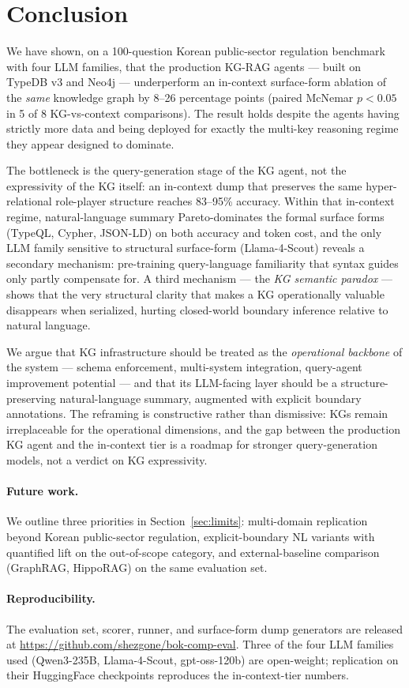 \section{Conclusion}\label{sec:conclusion}

We have shown, on a 100-question Korean public-sector regulation
benchmark with four LLM families, that the production KG-RAG
agents — built on TypeDB v3 and Neo4j — underperform an in-context
surface-form ablation of the \emph{same} knowledge graph by
8--26 percentage points (paired McNemar $p<0.05$ in 5 of 8
KG-vs-context comparisons). The result holds despite the agents
having strictly more data and being deployed for exactly the
multi-key reasoning regime they appear designed to dominate.

The bottleneck is the query-generation stage of the KG agent, not
the expressivity of the KG itself: an in-context dump that
preserves the same hyper-relational role-player structure reaches
83--95\% accuracy. Within that in-context regime, natural-language
summary Pareto-dominates the formal surface forms (TypeQL, Cypher,
JSON-LD) on both accuracy and token cost, and the only LLM family
sensitive to structural surface-form (Llama-4-Scout) reveals a
secondary mechanism: pre-training query-language familiarity that
syntax guides only partly compensate for. A third mechanism — the
\emph{KG semantic paradox} — shows that the very structural clarity
that makes a KG operationally valuable disappears when serialized,
hurting closed-world boundary inference relative to natural
language.

We argue that KG infrastructure should be treated as the
\emph{operational backbone} of the system — schema enforcement,
multi-system integration, query-agent improvement potential — and
that its LLM-facing layer should be a structure-preserving
natural-language summary, augmented with explicit boundary
annotations. The reframing is constructive rather than dismissive:
KGs remain irreplaceable for the operational dimensions, and the
gap between the production KG agent and the in-context tier is a
roadmap for stronger query-generation models, not a verdict on
KG expressivity.

\paragraph{Future work.}
We outline three priorities in Section~\ref{sec:limits}:
multi-domain replication beyond Korean public-sector regulation,
explicit-boundary NL variants with quantified lift on the
out-of-scope category, and external-baseline comparison
(GraphRAG, HippoRAG) on the same evaluation set.

\paragraph{Reproducibility.}
The evaluation set, scorer, runner, and surface-form dump
generators are released at
\url{https://github.com/shezgone/bok-comp-eval}. Three of the four
LLM families used (Qwen3-235B, Llama-4-Scout, gpt-oss-120b) are
open-weight; replication on their HuggingFace checkpoints
reproduces the in-context-tier numbers.
